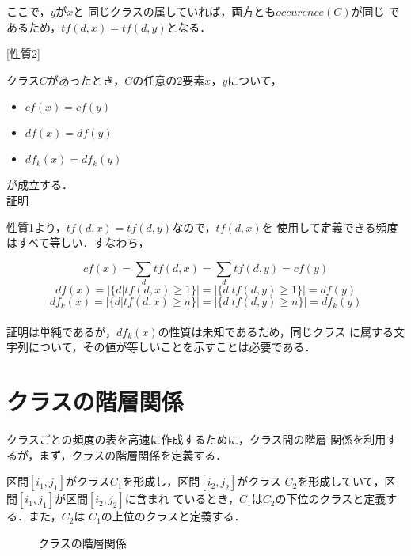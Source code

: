 ここで，$y$が$x$と
同じクラスの属していれば，両方とも$occurence(C)$が同じ
であるため，$tf(d,x) = tf(d, y)$となる．\\
\par

[性質2]\par
クラス$C$があったとき，$C$の任意の2要素$x$，$y$について，

 \begin{itemize}
  \item $cf(x)=cf(y)$
  \item $df(x)=df(y)$
  \item $df_k(x)=df_k(y)$
 \end{itemize}

が成立する．\\

証明\par

性質1より，$tf(d,x)=tf(d,y)$なので，$tf(d, x)$を
使用して定義できる頻度はすべて等しい．すなわち，

\par
$$cf(x) = \sum_{d}tf(d,x) = \sum_{d}tf(d,y) = cf(y)$$
$$df(x)  =\mid \{ d|tf(d,x)\geq 1 \}\mid
         =\mid \{ d|tf(d,y)\geq 1 \}\mid = df(y)$$
$$df_k(x)=\mid \{ d|tf(d,x)\geq n \}\mid 
         =\mid \{ d|tf(d,y)\geq n \}\mid = df_k(y)$$
\\

証明は単純であるが，$df_k(x)$の性質は未知であるため，同じクラス
に属する文字列について，その値が等しいことを示すことは必要である．

 
\section{クラスの階層関係}

クラスごとの頻度の表を高速に作成するために，クラス間の階層
関係を利用するが，まず，クラスの階層関係を定義する．

区間$[i_1, j_1]$がクラス$C_1$を形成し，区間$[i_2, j_2]$がクラス
$C_2$を形成していて，区間$[i_1,j_1]$が区間$[i_2, j_2]$に含まれ
ているとき，$C_1$は$C_2$の下位のクラスと定義する．また，$C_2$は
$C_1$の上位のクラスと定義する．\\

 \begin{figure}[htbp]
  \begin{center}
   \epsfxsize=7cm
   
   \caption{クラスの階層関係}
   \label{class_kankei}
  \end{center}
 \end{figure}


